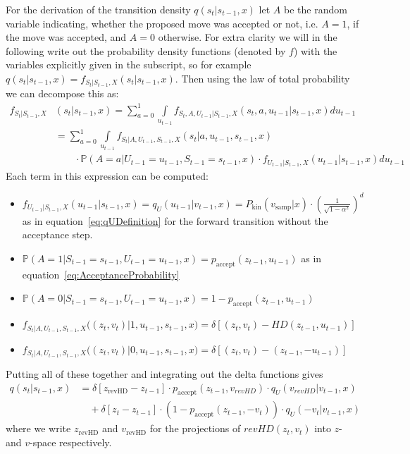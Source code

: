 For the derivation of the transition density $q(s_t|s_{t-1}, x)$ let $A$ be the random variable indicating, whether the proposed move was accepted or not, i.e. $A=1$, if the move was accepted, and $A=0$ otherwise. For extra clarity we will in the following write out the probability density functions (denoted by $f$) with the variables explicitly given in the subscript, so for example $q(s_t|s_{t-1}, x) = f_{S_t|S_{t-1}, X}(s_t|s_{t-1}, x)$. Then using the law of total probability we can decompose this as:
\begin{equation}
\begin{split}
f_{S_t|S_{t-1}, X}&(s_t|s_{t-1}, x)= \sum_{a=0}^1 \int \limits_{u_{t-1}} f_{S_t, A, U_{t-1}|S_{t-1}, X}(s_t, a, u_{t-1}|s_{t-1}, x) du_{t-1} \\
& = \sum_{a=0}^1 \int \limits_{u_{t-1}} f_{S_t|A, U_{t-1}, S_{t-1}, X}(s_t| a, u_{t-1}, s_{t-1}, x) \\
& \qquad\cdot \mathbb{P}(A = a|U_{t-1} = u_{t-1}, S_{t-1} = s_{t-1}, x) \cdot f_{U_{t-1}|S_{t-1}, X}(u_{t-1}|s_{t-1}, x) du_{t-1}
\end{split}
\end{equation}
Each term in this expression can be computed:
\begin{itemize}
\item $f_{U_{t-1}|S_{t-1}, X}(u_{t-1}|s_{t-1}, x) = q_U(u_{t-1}|v_{t-1}, x) = P_\textrm{kin}(v_{\textrm{samp}}|x) \cdot (\frac{1}{\sqrt{1 - \alpha^2}})^{d}$ as in equation~\eqref{eq:qUDefinition} for the forward transition without the acceptance step.
\item $\mathbb{P}(A=1|S_{t-1} = s_{t-1}, U_{t-1} = u_{t-1}, x) = p_{\textrm{accept}}(z_{t-1}, u_{t-1})$ as in equation~\eqref{eq:AcceptanceProbability}
\item $\mathbb{P}(A=0|S_{t-1} = s_{t-1}, U_{t-1} = u_{t-1}, x) = 1- p_{\textrm{accept}}(z_{t-1}, u_{t-1})$
\item $f_{S_t|A, U_{t-1}, S_{t-1}, X}\big((z_t, v_t)| 1, u_{t-1}, s_{t-1}, x\big) = \delta \left[(z_t, v_t) - HD(z_{t-1}, u_{t-1}) \right]$
\item $f_{S_t|A, U_{t-1}, S_{t-1}, X}\big((z_t, v_t)| 0, u_{t-1}, s_{t-1}, x\big) = \delta \left[(z_t, v_t) - (z_{t-1}, -u_{t-1}) \right]$
\end{itemize}

Putting all of these together and integrating out the delta functions gives
\begin{equation}
\begin{split}
q(s_t |s_{t-1}, x) &= \delta \left[z_{\textrm{revHD}} - z_{t-1} \right] \cdot p_{\textrm{accept}}(z_{t-1}, v_{revHD}) \cdot q_U(v_{revHD}|v_{t-1}, x) \\
&\quad + \delta \left[ z_t - z_{t-1} \right] \cdot (1 - p_{\textrm{accept}}(z_{t-1}, -v_t)) \cdot q_U(-v_t|v_{t-1}, x)
\end{split}
\end{equation}
where we write $z_{\textrm{revHD}}$ and $v_{\textrm{revHD}}$ for the projections of $revHD(z_t, v_t)$ into $z$- and $v$-space respectively.

